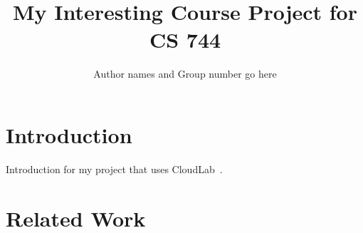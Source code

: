 \documentclass[pdftex,twocolumn,10pt,letterpaper]{article}
\begin{document}
\title{My Interesting Course Project for CS 744}
\author{Author names and Group number go here}
\date{}


\maketitle

\section{Introduction}
Introduction for my project that uses CloudLab~\cite{RicciEide:login14}.
\lipsum[4-11]
 
\section{Related Work}
\end{document}
